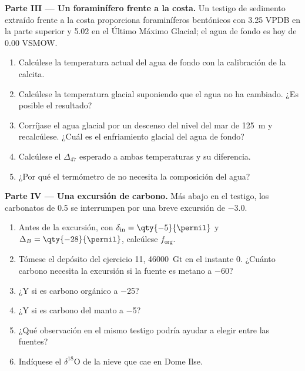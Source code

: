\begin{problem}
\medskip\noindent\textbf{Parte III --- Un foraminífero frente a la costa.} Un
testigo de sedimento extraído frente a la costa proporciona foraminíferos bentónicos con \qty{3.25}{\permil}
VPDB en la parte superior y \qty{5.02}{\permil} en el Último Máximo Glacial; el agua de
fondo es hoy de \qty{0.00}{\permil} VSMOW.
\begin{enumerate}[resume]
\item Calcúlese la temperatura actual del agua de fondo con la calibración
de la calcita.
\item Calcúlese la temperatura glacial suponiendo que el agua no ha cambiado. ¿Es
posible el resultado?
\item Corríjase el agua glacial por un descenso del nivel del mar de \qty{125}{m} y
recalcúlese. ¿Cuál es el enfriamiento glacial del agua de fondo?
\item Calcúlese el $\Delta_{47}$ esperado a ambas temperaturas y su
diferencia.
\item ¿Por qué el termómetro de  no necesita la composición del
agua?
\end{enumerate}

\medskip\noindent\textbf{Parte IV --- Una excursión de carbono.} Más abajo en el
testigo, los carbonatos de \qty{+0.5}{\permil} se interrumpen por una breve excursión de
\qty{-3.0}{\permil}.
\begin{enumerate}[resume]
\item Antes de la excursión, con $\delta_{\mathrm{in}} = \qty{-5}{\permil}$ y
$\Delta_B = \qty{-28}{\permil}$, calcúlese $f_{\mathrm{org}}$.
\item Tómese el depósito del ejercicio 11, \qty{46000}{Gt} en el instante 0. ¿Cuánto
carbono necesita la excursión si la fuente es metano a \qty{-60}{\permil}?
\item ¿Y si es carbono orgánico a \qty{-25}{\permil}?
\item ¿Y si es carbono del manto a \qty{-5}{\permil}?
\item ¿Qué observación en el mismo testigo podría ayudar a elegir entre
las fuentes?
\item Indíquese el $\delta^{18}\mathrm O$ de la nieve que cae en Dome Ilse.
\end{enumerate}
\end{problem}

